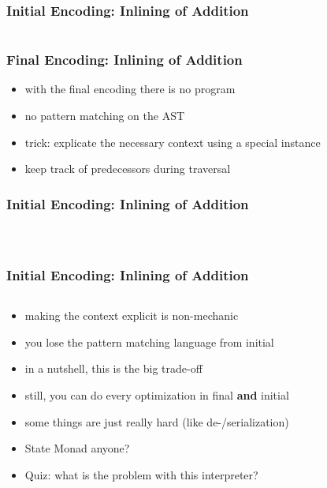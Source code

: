 \documentclass[aspectratio=169, hyperref={colorlinks, linkcolor=beamer@centricgreen}, urlcolor=links]{beamer}
\begin{document}
\begin{frame}[fragile]
  \frametitle{Initial Encoding: Inlining of Addition}
  \inputminted[fontsize=\footnotesize]{scala}{snippets/optimizer-inline-addition.scala}
\end{frame}

\begin{frame}
  \frametitle{Final Encoding: Inlining of Addition}
  \begin{itemize}
  \item with the final encoding there is no program
  \item no pattern matching on the AST
  \item trick: explicate the necessary context using a special instance
  \item keep track of predecessors during traversal
  \end{itemize}
\end{frame}

\begin{frame}[fragile]
  \frametitle{Initial Encoding: Inlining of Addition}
  \inputminted[fontsize=\footnotesize]{scala}{snippets/final-tagless-opt-ctx.scala}
  \vfill{}
  \inputminted[fontsize=\footnotesize]{scala}{snippets/final-tagless-opt-type.scala}
  \vfill{}
  \inputminted[fontsize=\footnotesize]{scala}{snippets/final-tagless-opt-sig.scala}
\end{frame}

\begin{frame}[fragile]
  \frametitle{Initial Encoding: Inlining of Addition}
  \inputminted[fontsize=\footnotesize]{scala}{snippets/final-tagless-opt-impl.scala}
\end{frame}

\begin{frame}[fragile]
  \begin{itemize}
  \item<1-> making the context explicit is non-mechanic
  \item<1-> you lose the pattern matching language from initial
  \item<1-> in a nutshell, this is the big trade-off
  \item<1-> still, you can do every optimization in final \textbf{and} initial
  \item<1-> some things are just really hard (like de-/serialization)
  \item<2> State Monad anyone?
  \item<2> Quiz: what is the problem with this interpreter?
  \end{itemize}
\end{frame}
\end{document}
